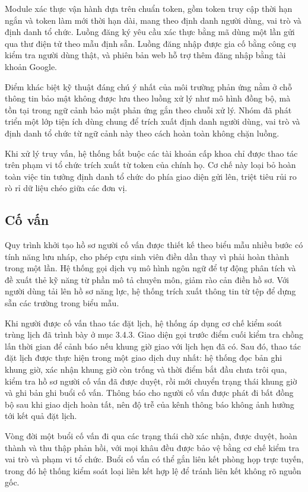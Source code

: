 \documentclass[12pt,a4paper,oneside]{report}
\begin{document}
Module xác thực vận hành dựa trên chuẩn token, gồm token truy cập thời hạn ngắn và token làm mới thời hạn dài, mang theo định danh người dùng, vai trò và định danh tổ chức. Luồng đăng ký yêu cầu xác thực bằng mã dùng một lần gửi qua thư điện tử theo mẫu định sẵn. Luồng đăng nhập được gia cố bằng công cụ kiểm tra người dùng thật, và phiên bản web hỗ trợ thêm đăng nhập bằng tài khoản Google.

Điểm khác biệt kỹ thuật đáng chú ý nhất của môi trường phản ứng nằm ở chỗ thông tin bảo mật không được lưu theo luồng xử lý như mô hình đồng bộ, mà tồn tại trong ngữ cảnh bảo mật phản ứng gắn theo chuỗi xử lý. Nhóm đã phát triển một lớp tiện ích dùng chung để trích xuất định danh người dùng, vai trò và định danh tổ chức từ ngữ cảnh này theo cách hoàn toàn không chặn luồng.

Khi xử lý truy vấn, hệ thống bắt buộc các tài khoản cấp khoa chỉ được thao tác trên phạm vi tổ chức trích xuất từ token của chính họ. Cơ chế này loại bỏ hoàn toàn việc tin tưởng định danh tổ chức do phía giao diện gửi lên, triệt tiêu rủi ro rò rỉ dữ liệu chéo giữa các đơn vị.

\subsection{Cố vấn}

Quy trình khởi tạo hồ sơ người cố vấn được thiết kế theo biểu mẫu nhiều bước có tính năng lưu nháp, cho phép cựu sinh viên điền dần thay vì phải hoàn thành trong một lần. Hệ thống gọi dịch vụ mô hình ngôn ngữ để tự động phân tích và đề xuất thẻ kỹ năng từ phần mô tả chuyên môn, giảm rào cản điền hồ sơ. Với người dùng tải lên hồ sơ năng lực, hệ thống trích xuất thông tin từ tệp để dựng sẵn các trường trong biểu mẫu.

Khi người được cố vấn thao tác đặt lịch, hệ thống áp dụng cơ chế kiểm soát trùng lịch đã trình bày ở mục 3.4.3. Giao diện gọi trước điểm cuối kiểm tra chồng lấn thời gian để cảnh báo nếu khung giờ giao với lịch hẹn đã có. Sau đó, thao tác đặt lịch được thực hiện trong một giao dịch duy nhất: hệ thống đọc bản ghi khung giờ, xác nhận khung giờ còn trống và thời điểm bắt đầu chưa trôi qua, kiểm tra hồ sơ người cố vấn đã được duyệt, rồi mới chuyển trạng thái khung giờ và ghi bản ghi buổi cố vấn. Thông báo cho người cố vấn được phát đi bất đồng bộ sau khi giao dịch hoàn tất, nên độ trễ của kênh thông báo không ảnh hưởng tới kết quả đặt lịch.

Vòng đời một buổi cố vấn đi qua các trạng thái chờ xác nhận, được duyệt, hoàn thành và thu thập phản hồi, với mọi khâu đều được bảo vệ bằng cơ chế kiểm tra vai trò và phạm vi tổ chức. Buổi cố vấn có thể gắn liên kết phòng họp trực tuyến, trong đó hệ thống kiểm soát loại liên kết hợp lệ để tránh liên kết không rõ nguồn gốc.
\end{document}
